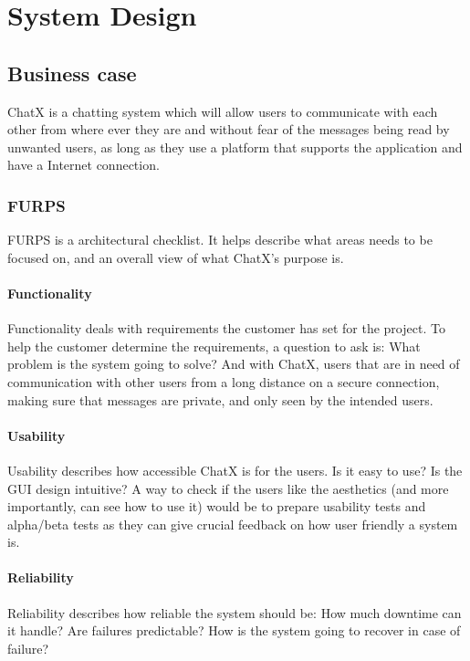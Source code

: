 \chapter{System Design}

\section{Business case}

ChatX is a chatting system which will allow users to communicate with each other from where ever they are and without fear of the messages being read by unwanted users, as long as they use a platform that supports the application and have a Internet connection.

\subsection{FURPS}
FURPS is a architectural checklist. It helps describe what areas needs to be focused on, and an overall view of what ChatX's purpose is.

\subsubsection{Functionality}
Functionality deals with requirements the customer has set for the project. To help the customer determine the requirements, a question to ask is: What problem is the system going to solve? And with ChatX, users that are in need of communication with other users from a long distance on a secure connection, making sure that messages are private, and only seen by the intended users.

\subsubsection{Usability}
Usability describes how accessible ChatX is for the users. Is it easy to use? Is the GUI design intuitive? A way to check if the users like the aesthetics (and more importantly, can see how to use it) would be to prepare usability tests and alpha/beta tests as they can give crucial feedback on how user friendly a system is.

\subsubsection{Reliability} 
Reliability describes how reliable the system should be: How much downtime can it handle? Are failures predictable? How is the system going to recover in case of failure? 

